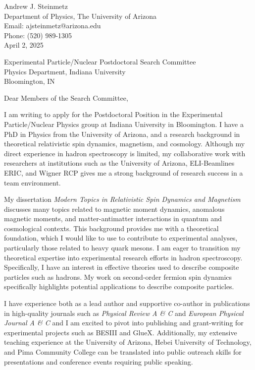 \documentclass[11pt]{article}
\begin{document}
Andrew J. Steinmetz\\
Department of Physics, The University of Arizona\\
Email: ajsteinmetz@arizona.edu\\
Phone: (520) 989-1305\\

April 2, 2025

\vspace{1em}

\noindent
Experimental Particle/Nuclear Postdoctoral Search Committee\\
Physics Department, Indiana University\\
Bloomington, IN

\vspace{1em}

\noindent
Dear Members of the Search Committee,

\vspace{1em}

I am writing to apply for the Postdoctoral Position in the Experimental Particle/Nuclear Physics group at Indiana University in Bloomington. I have a PhD in Physics from the University of Arizona, and a research background in theoretical relativistic spin dynamics, magnetism, and cosmology. Although my direct experience in hadron spectroscopy is limited, my collaborative work with researchers at institutions such as the University of Arizona, ELI-Beamlines ERIC, and Wigner RCP gives me a strong background of research success in a team environment.

My dissertation \textit{Modern Topics in Relativistic Spin Dynamics and Magnetism} discusses many topics related to magnetic moment dynamics, anomalous magnetic moments, and matter-antimatter interactions in quantum and cosmological contexts. This background provides me with a theoretical foundation, which I would like to use to contribute to experimental analyses, particularly those related to heavy quark mesons. I am eager to transition my theoretical expertise into experimental research efforts in hadron spectroscopy. Specifically, I have an interest in effective theories used to describe composite particles such as hadrons. My work on second-order fermion spin dynamics specifically highlights potential applications to describe composite particles.

I have experience both as a lead author and supportive co-author in publications in high-quality journals such as \textit{Physical Review A \& C} and \textit{European Physical Journal A \& C} and I am excited to pivot into publishing and grant-writing for experimental projects such as BESIII and GlueX. Additionally, my extensive teaching experience at the University of Arizona, Hebei University of Technology, and Pima Community College can be translated into public outreach skills for presentations and conference events requiring public speaking.
\end{document}
